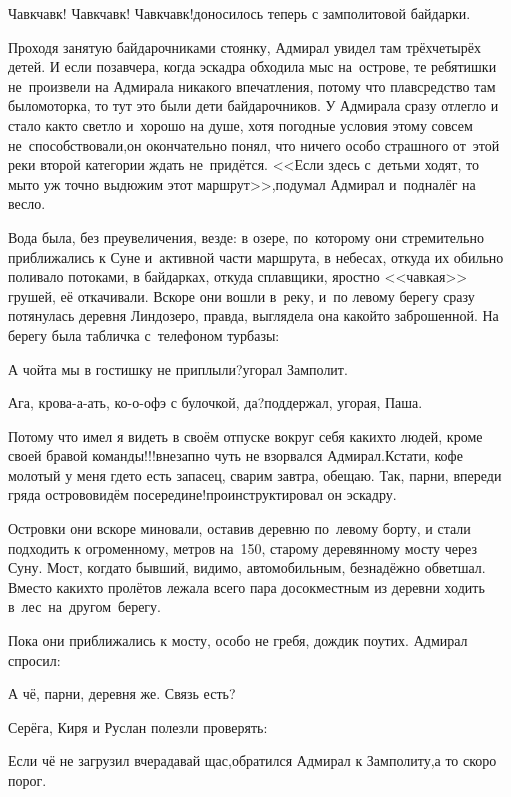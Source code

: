 \diagdash Чавк\sdash чавк! Чавк\sdash чавк! Чавк\sdash чавк!\mdash доносилось теперь с замполитовой байдарки.

Проходя занятую байдарочниками стоянку, Адмирал увидел там трёх\sdash четырёх\myldots{} детей. И если позавчера, когда  эскадра обходила мыс на~острове, те ребятишки не~произвели на Адмирала никакого впечатления, потому что плавсредство там было\mdash моторка, то тут это были дети байдарочников. У Адмирала сразу отлегло и стало как\sdash то светло и~хорошо на душе, хотя погодные условия этому совсем не~способствовали,\mdash он окончательно понял, что ничего особо страшного от~этой реки второй категории ждать не~придётся. <<Если здесь с~детьми ходят, то мы\sdash то уж точно выдюжим этот маршрут>>,\mdash подумал Адмирал и~подналёг на весло.

Вода была, без преувеличения, везде: в озере, по~которому они стремительно приближались к Суне и~активной части маршрута, в небесах, откуда их обильно поливало потоками, в байдарках, откуда сплавщики, яростно <<чавкая>> грушей, её откачивали. Вскоре они вошли в~реку, и~по левому берегу сразу потянулась деревня Линдозеро, правда, выглядела она какой\sdash то заброшенной. На берегу была табличка с~телефоном турбазы:

\diagdash А чойта мы в гостишку не приплыли?\mdash угорал Замполит.

\diagdash Ага, крова-а-ать, ко-о-офэ с булочкой, да?\mdash поддержал, угорая, Паша.

\diagdash Потому что имел я видеть в своём отпуске вокруг себя каких\sdash то людей, кроме своей бравой команды!!!\mdash внезапно чуть не взорвался Адмирал.\mdash Кстати, кофе молотый у меня где\sdash то есть запасец, сварим завтра, обещаю. Так, парни, впереди гряда островов\mdash идём посередине!\mdash проинструктировал он эскадру.

Островки они вскоре миновали, оставив деревню по~левому борту, и стали подходить к огроменному, метров на~150, старому деревянному мосту через Суну. Мост, когда\sdash то бывший, видимо, автомобильным, безнадёжно обветшал. Вместо каких\sdash то пролётов лежала всего пара досок\mdash местным из деревни ходить в~лес~на~другом~берегу.

Пока они приближались к мосту, особо не гребя, дождик поутих. Адмирал спросил:

\diagdash А чё, парни, деревня же. Связь есть?

Серёга, Киря и Руслан полезли проверять:

\diagdash Если чё не загрузил вчера\mdash давай щас,\mdash обратился Адмирал к Замполиту,\mdash а то скоро порог.

